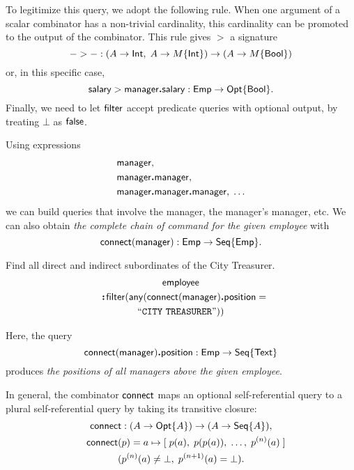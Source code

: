 To legitimize this query, we adopt the following rule.  When one argument of a
scalar combinator has a non-trivial cardinality, this cardinality can be
promoted to the output of the combinator.  This rule gives ${>}$ a signature
\begin{equation*}
    {-}>{-} : (A \to \mathsf{Int},\; A \to M\{\mathsf{Int}\}) \to (A \to M\{\mathsf{Bool}\})
\end{equation*}
or, in this specific case,
\begin{equation*}
    \mathsf{salary} > \mathsf{manager}\boldsymbol{.}\mathsf{salary} : \mathsf{Emp} \to \mathsf{Opt}{\left\{\mathsf{Bool}\right\}}.
\end{equation*}
Finally, we need to let $\mathsf{filter}$ accept predicate queries with optional
output, by treating $\bot$ as $\mathsf{false}$.

Using expressions
\begin{align*}
    & \mathsf{manager}, \\
    & \mathsf{manager}\boldsymbol{.}\mathsf{manager}, \\
    & \mathsf{manager}\boldsymbol{.}\mathsf{manager}\boldsymbol{.}\mathsf{manager},\; \ldots
\end{align*}
we can build queries that involve the manager, the manager's manager, etc.  We
can also obtain \emph{the complete chain of command for the given employee}
with
\begin{equation*}
    \mathsf{connect}(\mathsf{manager}) : \mathsf{Emp} \to \mathsf{Seq}{\left\{\mathsf{Emp}\right\}}.
\end{equation*}

\begin{demo}
    \label{ex:city-treasurer-subordinates}
    Find all direct and indirect subordinates of the City Treasurer.
    \begin{multline*}
        \Employee \\
        \shoveleft{\Apply\Filter(\Any(\Connect(\Manager)\To\Position =} \\
        \textliteral{CITY\ TREASURER}))
    \end{multline*}
\end{demo}

Here, the query
\begin{equation*}
    \mathsf{connect}(\mathsf{manager})\boldsymbol{.}\mathsf{position} : \mathsf{Emp} \to \mathsf{Seq}{\left\{\mathsf{Text}\right\}}
\end{equation*}
produces \emph{the positions of all managers above the given employee}.

In general, the combinator $\mathsf{connect}$ maps an optional self-referential query to a
plural self-referential query by taking its transitive closure:
\begin{multline*}
    \Connect : (A \to \Opt{A}) \to (A \to \Seq{A}), \\
    \shoveleft{\Connect(p) = a \mapsto [\;p(a),\; p(p(a)),\; \ldots,\; p^{(n)}(a)\;]} \\
    (p^{(n)}(a) \ne \bot,\; p^{(n+1)}(a) = \bot).
\end{multline*}

